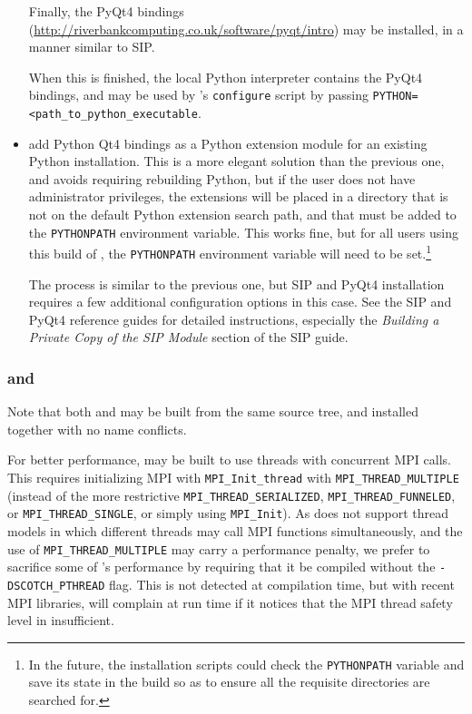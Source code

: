 \documentclass[a4paper,10pt,twoside]{csshortdoc}
\begin{document}
\begin{itemize}
      Finally, the PyQt4 bindings
      (\url{http://riverbankcomputing.co.uk/software/pyqt/intro}) may be
      installed, in a manner similar to SIP.

      When this is finished, the local Python interpreter contains
      the PyQt4 bindings, and may be used by \CS's \texttt{configure}
      script by passing \texttt{PYTHON=<path\_to\_python\_executable}.

\item add Python Qt4 bindings as a Python extension module for an existing
      Python installation. This is a more elegant solution than the previous
      one, and avoids requiring rebuilding Python, but if the user does not
      have administrator privileges, the extensions will be placed in a
      directory that is not on the default Python extension search path, and
      that must be added to the \texttt{PYTHONPATH} environment variable.
      This works fine, but for all users using this build of \CS, the
      \texttt{PYTHONPATH} environment variable will need to be
      set.\footnote{In the future, the \CS installation scripts could check
      the \texttt{PYTHONPATH} variable and save its state in the build so as
      to ensure all the requisite directories are searched for.}

      The process is similar to the previous one, but SIP and PyQt4
      installation requires a few additional configuration options
      in this case. See the SIP and PyQt4 reference guides for
      detailed instructions, especially the \emph{Building a Private
      Copy of the SIP Module} section of the SIP guide.

\end{itemize}

\subsubsection{\scotch and \ptscotch\label{sec:ext:scotch}}

Note that both \scotch and \ptscotch may be built from the same source
tree, and installed together with no name conflicts.

For better performance, \ptscotch may be built to use threads with concurrent
MPI calls. This requires initializing MPI with \texttt{MPI\_Init\_thread}
with \texttt{MPI\_THREAD\_MULTIPLE} (instead of the more restrictive
\texttt{MPI\_THREAD\_SERIALIZED}, \texttt{MPI\_THREAD\_FUNNELED}, or
\texttt{MPI\_THREAD\_SINGLE}, or simply using \texttt{MPI\_Init}).
As \CS does not support thread models in which different threads may call
MPI functions simultaneously, and the use of \texttt{MPI\_THREAD\_MULTIPLE}
may carry a performance penalty, we prefer to sacrifice some of
\ptscotch's performance by requiring that it be compiled without the
\texttt{-DSCOTCH\_PTHREAD} flag. This is not detected at compilation time,
but with recent MPI libraries, \ptscotch will complain at run time
if it notices that the MPI thread safety level in insufficient.
\end{document}
